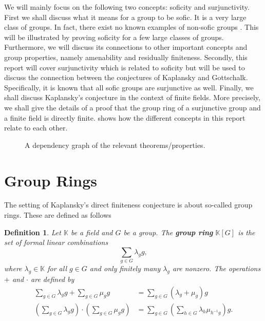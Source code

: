 \documentclass[titlepage, a4paper]{article}
\newcommand{\F}{\mathbb{F}}
\theoremstyle{theoremdd}
\theoremstyle{definitiondd}
\newtheorem{definition}[theorem]{Definition}
\theoremstyle{remarkdd}
\begin{document}
We will mainly focus on the following two concepts: soficity and surjunctivity. First we shall discuss what it means for a group to be sofic. It is a very large class of groups. In fact, there exist no known examples of non-sofic groups \cite[introduction]{weiss_2000}. This will be illustrated by proving soficity for a few large classes of groups. Furthermore, we will discuss its connections to other important concepts and group properties, namely amenability and residually finiteness. Secondly, this report will cover surjunctivity which is related to soficity but will be used to discuss the connection between the conjectures of Kaplansky and Gottschalk. Specifically, it is known that all sofic groups are surjunctive as well.
Finally, we shall discuss Kaplansky's conjecture in the context of finite fields. More precisely, we shall give the details of a proof that the group ring of a surjunctive group and a finite field is directly finite.  shows how the different concepts in this report relate to each other.


\begin{figure}[h]
	\centering
{}
\caption{A dependency graph of the relevant theorems/properties. }
\label{fig:dependency_graph}
\end{figure}
\section{Group Rings}\label{sec:group_rings} 

The setting of Kaplansky's direct finiteness conjecture is about so-called group rings. These are defined as follows


\begin{definition}\label{def:group_ring}
	Let $\mathbb K$ be a field and $G$ be a group. The \textbf{group ring} $\mathbb K[G]$ is the set of formal linear combinations
    \[
        \sum_{g \in G} \lambda_g g,
    \]
    where $\lambda_g \in \mathbb K$ for all $g \in G$ and only finitely many $\lambda_g$ are nonzero. The operations $+$ and $\cdot$ are defined by
    \begin{align*}
        \sum_{g \in G} \lambda_g g + \sum_{g \in G} \mu_g g
        &= \sum_{g \in G} (\lambda_g+\mu_g) g \\
        \left(\sum_{g \in G} \lambda_g g \right) \cdot \left(\sum_{g \in G} \mu_g g \right)
        &= \sum_{g \in G} \left( \sum_{h \in G} \lambda_{h} \mu_{h^{-1}g} \right) g.
    \end{align*}
\end{definition}
\end{document}
